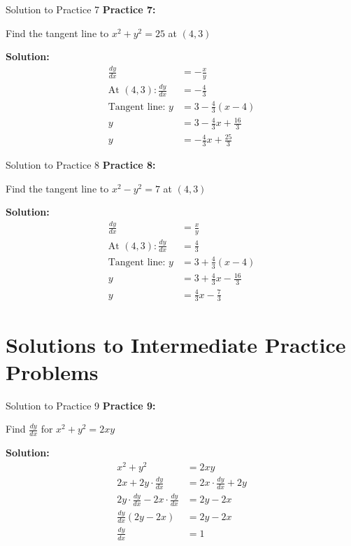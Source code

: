 \documentclass[aspectratio=169]{beamer}
\begin{document}
\begin{frame}{Solution to Practice 7}
\textbf{Practice 7:}

Find the tangent line to $x^2 + y^2 = 25$ at $(4, 3)$

\textbf{Solution:}
\[
\begin{aligned}
  \frac{dy}{dx} &= -\frac{x}{y} \\
  \text{At } (4, 3): \frac{dy}{dx} &= -\frac{4}{3} \\
  \text{Tangent line: } y &= 3 - \frac{4}{3}(x - 4) \\
  y &= 3 - \frac{4}{3}x + \frac{16}{3} \\
  y &= -\frac{4}{3}x + \frac{25}{3}
\end{aligned}
\]
\end{frame}

\begin{frame}{Solution to Practice 8}
\textbf{Practice 8:}

Find the tangent line to $x^2 - y^2 = 7$ at $(4, 3)$

\textbf{Solution:}
\[
\begin{aligned}
  \frac{dy}{dx} &= \frac{x}{y} \\
  \text{At } (4, 3): \frac{dy}{dx} &= \frac{4}{3} \\
  \text{Tangent line: } y &= 3 + \frac{4}{3}(x - 4) \\
  y &= 3 + \frac{4}{3}x - \frac{16}{3} \\
  y &= \frac{4}{3}x - \frac{7}{3}
\end{aligned}
\]
\end{frame}

\section{Solutions to Intermediate Practice Problems}

\begin{frame}{Solution to Practice 9}
\textbf{Practice 9:}

Find $\frac{dy}{dx}$ for $x^2 + y^2 = 2xy$

\textbf{Solution:}
\[
\begin{aligned}
  x^2 + y^2 &= 2xy \\
  2x + 2y \cdot \frac{dy}{dx} &= 2x \cdot \frac{dy}{dx} + 2y \\
  2y \cdot \frac{dy}{dx} - 2x \cdot \frac{dy}{dx} &= 2y - 2x \\
  \frac{dy}{dx}(2y - 2x) &= 2y - 2x \\
  \frac{dy}{dx} &= 1
\end{aligned}
\]
\end{frame}
\end{document}
